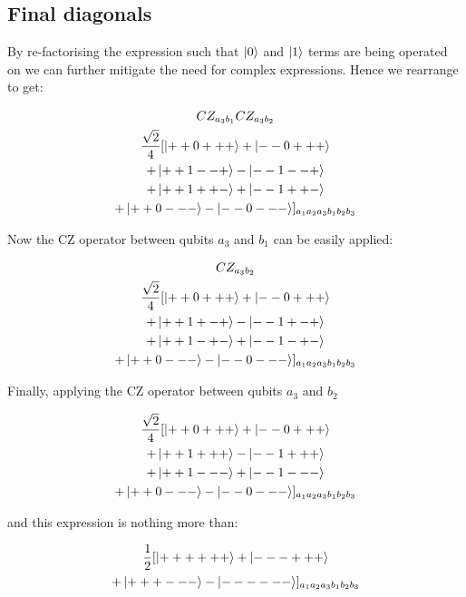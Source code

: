 \subsection{Final diagonals}

By re-factorising the expression such that $\ket{0}$ and $\ket{1}$ terms are being operated on we can further mitigate the need for complex expressions. Hence we rearrange to get:

\begin{multline*}
CZ _{a_{3} b_{1}} CZ _{a_{3} b_{2}} \\
\frac{\sqrt{2}}{4}
  [\ket{+ + 0 + + +} + \ket{- - 0 + + +} \\
  + \ket{+ + 1 - - +} - \ket{- - 1 - - +} \\
 + \ket{+ + 1 + + -} + \ket{- - 1 + + -} \\
 + \ket{+ + 0 - - -} - \ket{- - 0 - - -}] _{a_{1} a_{2} a_{3} b_{1} b_{2} b_{3}} \\
\end{multline*}

Now the CZ operator between qubits $a_{3}$ and $b_{1}$ can be easily applied:

\begin{multline*}
CZ _{a_{3} b_{2}} \\
\frac{\sqrt{2}}{4}
  [\ket{+ + 0 + + +} + \ket{- - 0 + + +} \\
  + \ket{+ + 1 + - +} - \ket{- - 1 + - +} \\
 + \ket{+ + 1 - + -} + \ket{- - 1 - + -} \\
 + \ket{+ + 0 - - -} - \ket{- - 0 - - -}] _{a_{1} a_{2} a_{3} b_{1} b_{2} b_{3}} \\
\end{multline*}

Finally, applying the CZ operator between qubits $a_{3}$ and $b_{2}$

\begin{multline*}
\frac{\sqrt{2}}{4}
  [\ket{+ + 0 + + +} + \ket{- - 0 + + +} \\
  + \ket{+ + 1 + + +} - \ket{- - 1 + + +} \\
 + \ket{+ + 1 - - -} + \ket{- - 1 - - -} \\
 + \ket{+ + 0 - - -} - \ket{- - 0 - - -}] _{a_{1} a_{2} a_{3} b_{1} b_{2} b_{3}} \\
\end{multline*}

and this expression is nothing more than:

\begin{multline*}
\frac{1}{2}
  [\ket{+ + + + + +} + \ket{- - - + + +} \\
  + \ket{+ + + - - -} - \ket{- - - - - -}] _{a_{1} a_{2} a_{3} b_{1} b_{2} b_{3}} \\
\end{multline*}

